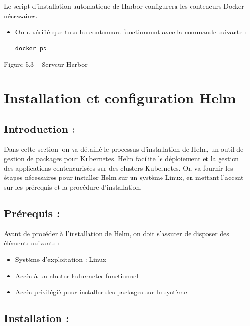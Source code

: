 Le script d’installation automatique de Harbor configurera les conteneurs Docker nécessaires.
\begin{itemize}
\item On a vérifié que tous les conteneurs fonctionnent avec la commande suivante :
\begin{verbatim}
docker ps
\end{verbatim}
\end{itemize}

\begin{center}
Figure 5.3 – Serveur Harbor
\end{center}

\section*{Installation et configuration Helm}

\subsection*{Introduction :}

Dans cette section, on va détaillé le processus d’installation de Helm, un outil de gestion de packages pour Kubernetes. Helm facilite le déploiement et la gestion des applications conteneurisées sur des clusters Kubernetes. On va fournir les étapes nécessaires pour installer Helm sur un système Linux, en mettant l’accent sur les prérequis et la procédure d’installation.

\subsection*{Prérequis :}

Avant de procéder à l’installation de Helm, on doit s’assurer de disposer des éléments suivants :

\begin{itemize}
\item Système d’exploitation : Linux
\item Accès à un cluster kubernetes fonctionnel
\item Accès privilégié pour installer des packages sur le système
\end{itemize}
\subsection*{Installation :}

